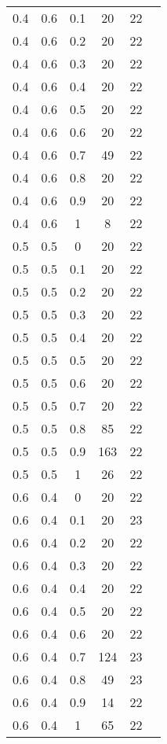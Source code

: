 \begin{table}
\begin{minipage}[!h]{0.50\hsize}
\begin{center}
{\begin{tabular}{c@{\hspace{5mm}}c@{\hspace{5mm}}c@{\hspace{5mm}}c@{\hspace{5mm}}c@{\hspace{5mm}}c}
				0.4     &0.6    &0.1    &20    &22\\
				0.4     &0.6    &0.2    &20    &22\\
				0.4     &0.6    &0.3    &20    &22\\
				0.4     &0.6    &0.4    &20    &22\\
				0.4     &0.6    &0.5    &20    &22\\
				0.4     &0.6    &0.6    &20    &22\\
				0.4     &0.6    &0.7    &49    &22\\
				0.4     &0.6    &0.8    &20    &22\\
				0.4     &0.6    &0.9    &20    &22\\
				0.4     &0.6    &1      &8     &22\\
				\midrule
				0.5     &0.5    &0      &20    &22\\
				0.5     &0.5    &0.1    &20    &22\\
				0.5     &0.5    &0.2    &20    &22\\
				0.5     &0.5    &0.3    &20    &22\\
				0.5     &0.5    &0.4    &20    &22\\
				0.5     &0.5    &0.5    &20    &22\\
				0.5     &0.5    &0.6    &20    &22\\
				0.5     &0.5    &0.7    &20    &22\\
				0.5     &0.5    &0.8    &85    &22\\
				0.5     &0.5    &0.9    &163   &22\\
				0.5     &0.5    &1      &26    &22\\
				\midrule
				0.6     &0.4    &0      &20    &22\\
				0.6     &0.4    &0.1    &20    &23\\
				0.6     &0.4    &0.2    &20    &22\\
				0.6     &0.4    &0.3    &20    &22\\
				0.6     &0.4    &0.4    &20    &22\\
				0.6     &0.4    &0.5    &20    &22\\
				0.6     &0.4    &0.6    &20    &22\\
				0.6     &0.4    &0.7    &124   &23\\
				0.6     &0.4    &0.8    &49    &23\\
				0.6     &0.4    &0.9    &14    &22\\
				0.6     &0.4    &1      &65    &22\\

\end{tabular}}
\end{center}
\end{minipage}
\end{table}
